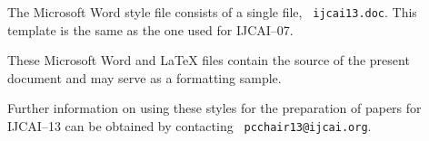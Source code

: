 \documentclass{article}
\begin{document}
The Microsoft Word style file consists of a single file, {\tt
ijcai13.doc}. This template is the same as the one used for
IJCAI--07.

These Microsoft Word and \LaTeX{} files contain the source of the
present document and may serve as a formatting sample.  

Further information on using these styles for the preparation of
papers for IJCAI--13 can be obtained by contacting {\tt
pcchair13@ijcai.org}.



\end{document}
